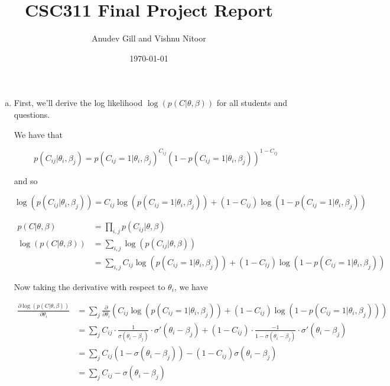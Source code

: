 \documentclass{article}
\title{CSC311 Final Project Report}
\author{Anudev Gill and Vishnu Nitoor}
\date{\today}
\begin{document}
\maketitle

\section{}

\begin{enumerate}[(a)]
    \item First, we'll derive the log likelihood $\log(p(C | \theta, \beta))$ for all students and questions. 
    
    We have that 

    \[p(C_{ij} | \theta_i, \beta_j) = p(C_{ij} = 1 | \theta_i, \beta_j)^{C_{ij}} (1 - p(C_{ij} = 1 | \theta_i, \beta_j))^{1 - C_{ij}}\]

    and so 

    \[\log(p(C_{ij} | \theta_i, \beta_j)) = C_{ij} \log(p(C_{ij} = 1 | \theta_i, \beta_j)) + (1 - C_{ij}) \log(1 - p(C_{ij} = 1 | \theta_i, \beta_j))\]

    \begin{align*}
        p(C | \theta, \beta) &= \prod_{i, j} p(C_{ij} | \theta, \beta) \\[1em]
        \log(p(C | \theta, \beta)) &= \sum_{i, j} \log (p(C_{ij} | \theta, \beta)) \\
        &= \sum_{i, j} C_{ij} \log(p(C_{ij} = 1 | \theta_i, \beta_j)) + (1 - C_{ij}) \log(1 - p(C_{ij} = 1 | \theta_i, \beta_j))
    \end{align*}

    Now taking the derivative with respect to $\theta_i$, we have 

    \begin{align*}
        \frac{\partial  \log(p(C | \theta, \beta))}{\partial \theta_i} &= \sum_{j} \frac{\partial}{\partial \theta_i} \left(C_{ij} \log(p(C_{ij} = 1 | \theta_i, \beta_j)) + (1 - C_{ij}) \log(1 - p(C_{ij} = 1 | \theta_i, \beta_j))\right) \\
        &= \sum_{j} C_{ij} \cdot \frac{1}{\sigma(\theta_i - \beta_j)} \cdot \sigma'( \theta_i - \beta_j) + (1 - C_{ij}) \cdot \frac{-1}{1 - \sigma(\theta_i - \beta_j)} \cdot \sigma'( \theta_i - \beta_j) \\
        &= \sum_{j} C_{ij} \left(1 - \sigma(\theta_i - \beta_j)\right) - (1 - C_{ij}) \sigma(\theta_i - \beta_j)\\
        &= \sum_j C_{ij} - \sigma(\theta_i - \beta_j)
    \end{align*}


\end{enumerate}
\end{document}
